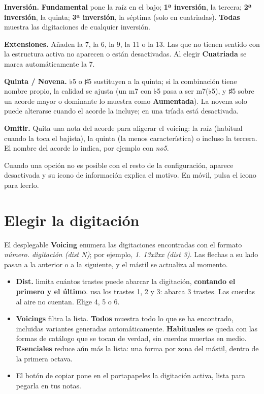 \documentclass[a4paper,11pt,oneside]{report}
\providecommand{\tightlist}{\setlength{\itemsep}{2pt}\setlength{\parskip}{0pt}}
\let\originaltexttt\texttt
\renewcommand{\texttt}[1]{\originaltexttt{\seqsplit{#1}}}
\begin{document}
\textbf{Inversión.} \textbf{Fundamental} pone la raíz en el bajo; \textbf{1ª inversión}, la tercera; \textbf{2ª inversión}, la quinta; \textbf{3ª inversión}, la séptima (solo en cuatriadas). \textbf{Todas} muestra las digitaciones de cualquier inversión.

\textbf{Extensiones.} Añaden la 7, la 6, la 9, la 11 o la 13. Las que no tienen sentido con la estructura activa no aparecen o están desactivadas. Al elegir \textbf{Cuatriada} se marca automáticamente la 7.

\textbf{Quinta / Novena.} ♭5 o ♯5 sustituyen a la quinta; si la combinación tiene nombre propio, la calidad se ajusta (un m7 con ♭5 pasa a ser m7(♭5), y ♯5 sobre un acorde mayor o dominante lo muestra como \textbf{Aumentada}). La novena solo puede alterarse cuando el acorde la incluye; en una tríada está desactivada.

\textbf{Omitir.} Quita una nota del acorde para aligerar el voicing: la raíz (habitual cuando la toca el bajista), la quinta (la menos característica) o incluso la tercera. El nombre del acorde lo indica, por ejemplo con \emph{no5}.

Cuando una opción no es posible con el resto de la configuración, aparece desactivada y su icono de información explica el motivo. En móvil, pulsa el icono para leerlo.

\Needspace{3.5cm}
\section{Elegir la digitación}\label{elegir-la-digitaciuxf3n}

El desplegable \textbf{Voicing} enumera las digitaciones encontradas con el formato \emph{número. digitación (dist N)}; por ejemplo, \emph{1. 13x2xx (dist 3)}. Las flechas a su lado pasan a la anterior o a la siguiente, y el mástil se actualiza al momento.

\begin{itemize}
\tightlist
\item
  \textbf{Dist.} limita cuántos trastes puede abarcar la digitación, \textbf{contando el primero y el último}. \texttt{13x2xx} usa los trastes 1, 2 y 3: abarca 3 trastes. Las cuerdas al aire no cuentan. Elige 4, 5 o 6.
\item
  \textbf{Voicings} filtra la lista. \textbf{Todos} muestra todo lo que se ha encontrado, incluidas variantes generadas automáticamente. \textbf{Habituales} se queda con las formas de catálogo que se tocan de verdad, sin cuerdas muertas en medio. \textbf{Esenciales} reduce aún más la lista: una forma por zona del mástil, dentro de la primera octava.
\item
  El botón de copiar pone en el portapapeles la digitación activa, lista para pegarla en tus notas.
\end{itemize}
\end{document}
